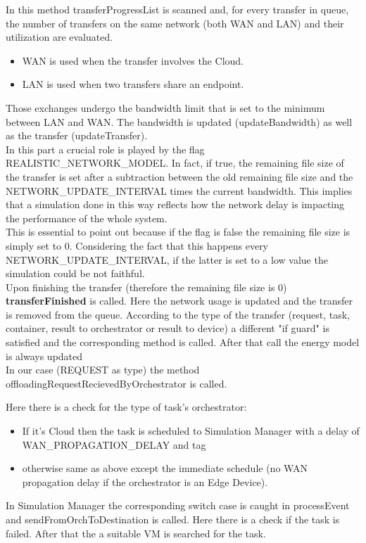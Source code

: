 \documentclass[12pt]{report}
\begin{document}
In this method transferProgressList is scanned and, for every transfer in queue, the number of transfers on the same network (both WAN and LAN) and their utilization are evaluated.
\begin{itemize}
	\item WAN is used when the transfer involves the Cloud.
	\item LAN is used when two transfers share an endpoint.
\end{itemize}
Those exchanges undergo the bandwidth limit that is set to the minimum between LAN and WAN.
The bandwidth is updated (updateBandwidth) as well as the transfer (updateTransfer).\\
In this part a crucial role is played by the flag REALISTIC\_NETWORK\_MODEL. In fact, if true, the remaining file size of the transfer is set after a subtraction between the old remaining file size and the NETWORK\_UPDATE\_INTERVAL times the current bandwidth. This implies that a simulation done in this way reflects how the network delay is impacting the performance of the whole system.\\
This is essential to point out because if the flag is false the remaining file size is simply set to 0. Considering the fact that this happens every NETWORK\_UPDATE\_INTERVAL, if the latter is set to a low value the simulation could be not faithful.\\
Upon finishing the transfer (therefore the remaining file size is 0) \textbf{transferFinished} is called.
Here the network usage is updated and the transfer is removed from the queue.
According to the type of the transfer (request, task, container, result to orchestrator or result to device) a different "if guard" is satisfied and the corresponding method is called. After that call the energy model is always updated\\
In our case (REQUEST as type) the method offloadingRequestRecievedByOrchestrator is called.

Here there is a check for the type of task's orchestrator:
\begin{itemize}
	\item If it's Cloud then the task is scheduled to Simulation Manager with a delay of WAN\_PROPAGATION\_DELAY and tag 
	\item otherwise same as above except the immediate schedule (no WAN propagation delay if the orchestrator is an Edge Device).
\end{itemize}
\vspace{0.5cm}
In Simulation Manager the corresponding switch case is caught in processEvent and sendFromOrchToDestination is called.
Here there is a check if the task is failed. After that the a suitable VM is searched for the task.
\end{document}
